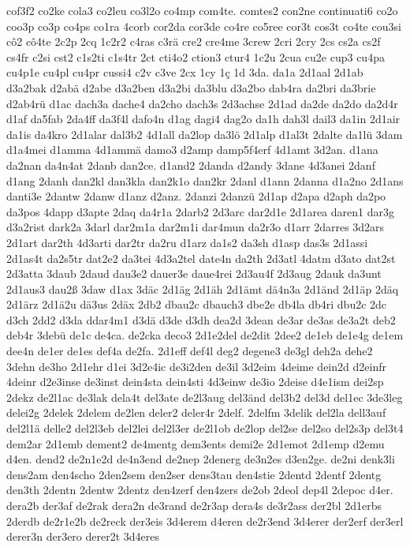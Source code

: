 {cof3f2
co2ke
cola3
co2leu
co3l2o
co4mp
com4te.
comtes2
con2ne
continuati6
co2o
coo3p
co3p
co4ps
co1ra
4corb
cor2da
cor3de
co4re
co5ree
cor3t
cos3t
co4te
cou3si
cô2
cô4te
2c2p
2cq
1c2r2
c4ras
c3rä
cre2
cre4me
3crew
2cri
2cry
2cs
cs2a
cs2f
cs4fr
c2si
cst2
c1s2ti
c1s4tr
2ct
cti4o2
ction3
ctur4
1c2u
2cua
cu2e
cup3
cu4pa
cu4p1e
cu4pl
cu4pr
cussi4
c2v
c3ve
2cx
1cy
1ç
1d
3da.
da1a
2d1aal
2d1ab
d3a2bak
d2abä
d2abe
d3a2ben
d3a2bi
da3blu
d3a2bo
dab4ra
da2bri
da3brie
d2ab4rü
d1ac
dach3a
dache4
da2cho
dach3s
2d3achse
2d1ad
da2de
da2do
da2d4r
d1af
da5fab
2da4ff
da3f4l
dafo4n
d1ag
dagi4
dag2o
da1h
dah3l
dail3
da1in
2d1air
da1is
da4kro
2d1alar
dal3b2
4d1all
da2lop
da3lö
2d1alp
d1al3t
2dalte
da1lü
3dam
d1a4mei
d1amma
4d1ammä
damo3
d2amp
damp5f4erf
4d1amt
3d2an.
d1ana
da2nan
da4n4at
2danb
dan2ce.
d1and2
2danda
d2andy
3dane
4d3anei
2danf
d1ang
2danh
dan2kl
dan3kla
dan2k1o
dan2kr
2danl
d1ann
2danna
d1a2no
2d1ans
danti3e
2dantw
2danw
d1anz
d2anz.
2danzi
2danzü
2d1ap
d2apa
d2aph
da2po
da3pos
4dapp
d3apte
2daq
da4r1a
2darb2
2d3arc
dar2d1e
2d1area
daren1
dar3g
d3a2rist
dark2a
3darl
dar2m1a
dar2m1i
dar4mun
da2r3o
d1arr
2darres
3d2ars
2d1art
dar2th
4d3arti
dar2tr
da2ru
d1arz
da1s2
da3sh
d1asp
das3s
2d1assi
2d1as4t
da2s5tr
dat2e2
da3tei
4d3a2tel
date4n
da2th
2d3atl
4datm
d3ato
dat2st
2d3atta
3daub
2daud
dau3e2
dauer3e
daue4rei
2d3au4f
2d3aug
2dauk
da3unt
2d1aus3
dau2ß
3daw
d1ax
3däc
2d1äg
2d1äh
2d1ämt
dä4n3a
2d1änd
2d1äp
2däq
2d1ärz
2d1ä2u
dä3us
2däx
2db2
dbau2c
dbauch3
dbe2e
db4la
db4ri
dbu2c
2dc
d3ch
2dd2
d3da
ddar4m1
d3dä
d3de
d3dh
dea2d
3dean
de3ar
de3as
de3a2t
deb2
deb4r
3debü
de1c
de4ca.
de2cka
deco3
2d1e2del
de2dit
2dee2
de1eb
de1e4g
de1em
dee4n
de1er
de1es
def4a
de2fa.
2d1eff
def4l
deg2
degene3
de3gl
deh2a
dehe2
3dehn
de3ho
2d1ehr
d1ei
3d2e4ic
de3i2den
de3il
3d2eim
4deime
dein2d
d2einfr
4deinr
d2e3inse
de3inst
dein4sta
dein4sti
4d3einw
de3io
2deise
d4e1ism
dei2sp
2dekz
de2l1ac
de3lak
dela4t
del3ate
de2l3aug
del3änd
del3b2
del3d
del1ec
3de3leg
delei2g
2delek
2delem
de2len
deler2
deler4r
2delf.
2delfm
3delik
del2la
dell3auf
del2l1ä
delle2
del2l3eb
del2lei
del2l3er
de2l1ob
de2lop
del2se
del2so
del2s3p
del3t4
dem2ar
2d1emb
dement2
de4mentg
dem3ents
demi2e
2d1emot
2d1emp
d2emu
d4en.
dend2
de2n1e2d
de4n3end
de2nep
2denerg
de3n2es
d3en2ge.
de2ni
denk3li
dens2am
den4scho
2den2sem
den2ser
dens3tau
den4stie
2dentd
2dentf
2dentg
den3th
2dentn
2dentw
2dentz
den4zerf
den4zers
de2ob
2deol
dep4l
2depoc
d4er.
dera2b
der3af
de2rak
dera2n
de3rand
de2r3ap
dera4s
de3r2ass
der2bl
2d1erbs
2derdb
de2r1e2b
de2reck
der3eis
3d4erem
d4eren
de2r3end
3d4erer
der2erf
der3erl
derer3n
der3ero
derer2t
3d4eres
}
